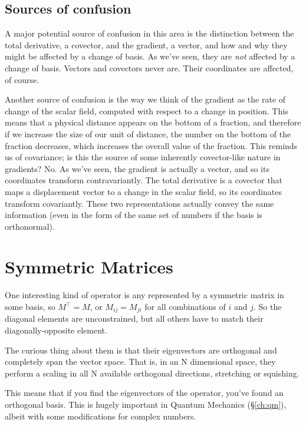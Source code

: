 \subsection{Sources of confusion}

A major potential source of confusion in this area is the distinction between the total derivative, a covector, and the gradient, a vector, and how and why they might be affected by a change of basis. As we've seen, they are \textit{not} affected by a change of basis. Vectors and covectors never are. Their coordinates are affected, of course.

Another source of confusion is the way we think of the gradient as the rate of change of the scalar field, computed with respect to a change in position. This means that a physical distance appears on the bottom of a fraction, and therefore if we increase the size of our unit of distance, the number on the bottom of the fraction decreases, which increases the overall value of the fraction. This reminds us of covariance; is this the source of some inherently covector-like nature in gradients? No. As we've seen, the gradient is actually a vector, and so its coordinates transform contravariantly. The total derivative is a covector that maps a displacement vector to a change in the scalar field, so its coordinates transform covariantly. These two representations actually convey the same information (even in the form of the same set of numbers if the basis is orthonormal).

\section{Symmetric Matrices}\label{ch:vectors-symmetric}

One interesting kind of operator is any represented by a symmetric matrix in some basis, so $M^\intercal = M$, or $M_{ij} = M_{ji}$ for all combinations of $i$ and $j$. So the diagonal elements are unconstrained, but all others have to match their diagonally-opposite element.

The curious thing about them is that their eigenvectors are orthogonal and completely span the vector space. That is, in an N dimensional space, they perform a scaling in all N available orthogonal directions, stretching or squishing.

This means that if you find the eigenvectors of the operator, you've found an orthogonal basis. This is hugely important in Quantum Mechanics (§\ref{ch:qm}), albeit with some modifications for complex numbers.

